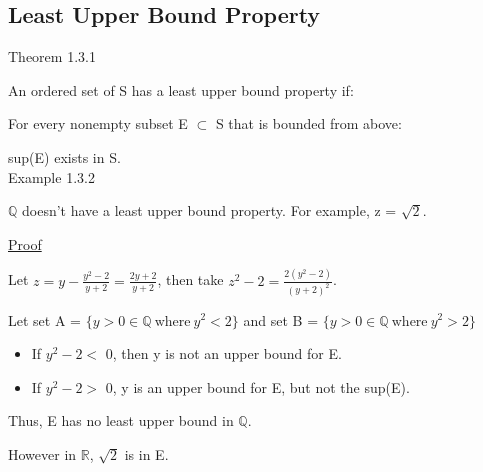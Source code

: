 \subsection{Least Upper Bound Property}

{ \color{red} Theorem 1.3.1 }

\qquad An ordered set of S has a least upper bound property if:

\qquad \qquad For every nonempty subset E $ \subset $ S that is bounded from above:

\qquad \qquad \qquad sup(E) exists in S. \\

{ \color{purple} Example 1.3.2 }

\qquad $ \mathbb{Q} $ doesn't have a least upper bound property. For example, z = $ \sqrt{2} $.

{\color{magenta} \underline{Proof}}

Let $ z = y - \frac{y^2-2}{y+2} = \frac{2y+2}{y+2} $, then take $ z^2-2 = \frac{2(y^2-2)}{(y+2)^2} $.

Let set A = $ \{ y > 0 \in \mathbb{Q} \ \text{where} \ y^2 < 2 \} $ and
set B = $ \{ y > 0 \in \mathbb{Q} \ \text{where} \ y^2 > 2 \} $

\begin{itemize}[leftmargin=2cm]
	\item If $ y^2-2 < $ 0, then y is not an upper bound for E.
	\item If $ y^2-2 > $ 0, y is an upper bound for E, but not the sup(E).
\end{itemize}

Thus, E has no least upper bound in $ \mathbb{Q} $.

However in $ \mathbb{R} $, $ \sqrt{2} $ is in E.

